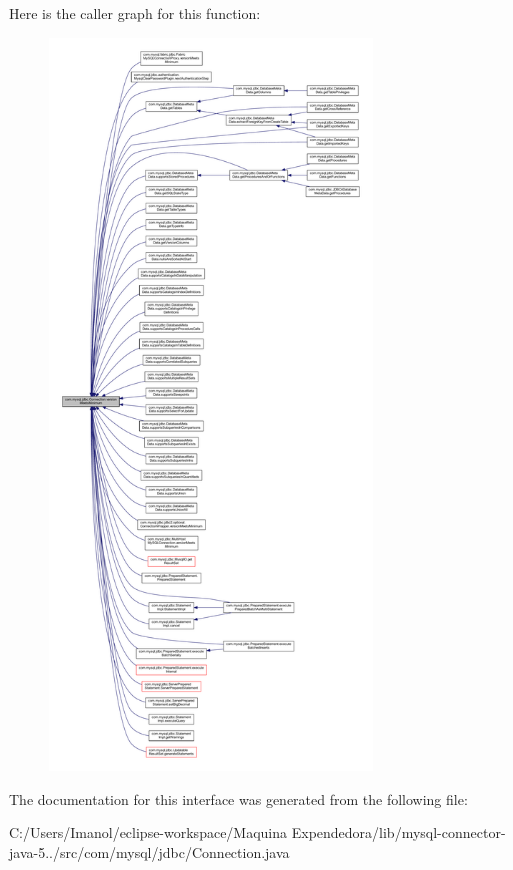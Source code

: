 Here is the caller graph for this function\+:\nopagebreak
\begin{figure}[H]
\begin{center}
\leavevmode
\includegraphics[height=550pt]{interfacecom_1_1mysql_1_1jdbc_1_1_connection_af05f0b2545de1a6a1ca7d41f467516d3_icgraph}
\end{center}
\end{figure}


The documentation for this interface was generated from the following file\+:\begin{DoxyCompactItemize}
\item 
C\+:/\+Users/\+Imanol/eclipse-\/workspace/\+Maquina Expendedora/lib/mysql-\/connector-\/java-\/5../src/com/mysql/jdbc/Connection.\+java\end{DoxyCompactItemize}
